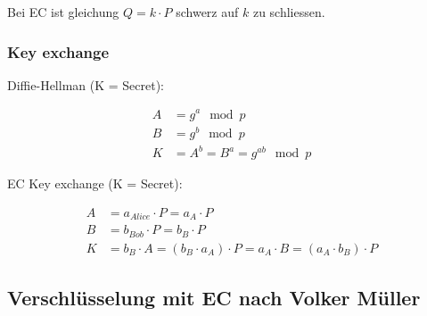 \documentclass[12pt]{scrartcl}
\begin{document}
Bei EC ist gleichung $Q = k \cdot P$ schwerz auf $k$ zu schliessen.\\





\subsubsection{Key exchange}

Diffie-Hellman (K = Secret): 

\begin{align}
    A &= g^a \mod p \\
    B &= g^b \mod p \\
    K &= A^b = B^a = g^{ab} \mod p    
\end{align}

EC Key exchange (K = Secret):

\begin{align}
    A &= a_{Alice} \cdot P = a_A \cdot P\\
    B &= b_{Bob} \cdot P = b_B \cdot P \\
    K &= b_B \cdot A = (b_B \cdot a_A) \cdot P = a_A \cdot B = (a_A \cdot b_B) \cdot P
\end{align}


\newpage
\subsection{Verschlüsselung mit EC nach Volker Müller}
\end{document}
